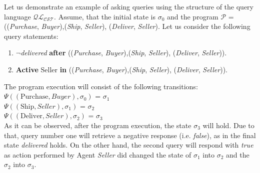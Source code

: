 \documentclass[a4paper]{article}
\begin{document}
Let us demonstrate an example of asking queries using the structure of the query language $\mathcal{QL_{CST}}$. 
Assume, that the initial state is $\sigma_0$ and the program $\mathcal{P}$ = ((\textit{Purchase}, \textit{Buyer}),(\textit{Ship}, \textit{Seller}), (\textit{Deliver}, \textit{Seller}).
Let us consider the following query statements:
\begin{enumerate}
  \item $\neg$\textit{delivered} \textbf{after} ((\textit{Purchase}, \textit{Buyer}),(\textit{Ship}, \textit{Seller}), (\textit{Deliver}, \textit{Seller})).
  \item \textbf{Active} Seller \textbf{in} ((\textit{Purchase}, \textit{Buyer}),(\textit{Ship}, \textit{Seller}), (\textit{Deliver}, \textit{Seller})).
\end{enumerate}
The program execution will consist of the following transitions: \\[0.5\baselineskip]
$\Psi((\text{Purchase},Buyer),\sigma_0)$ = $\sigma_1$ \\[0.1\baselineskip]
$\Psi((\text{Ship},Seller),\sigma_1)$ = $\sigma_2$ \\[0.1\baselineskip]
$\Psi((\text{Deliver},Seller),\sigma_2)$ = $\sigma_3$ \\[0.7\baselineskip]
As it can be observed, after the program execution, the state $\sigma_3$ will hold. Due to that, query number one will retrieve a negative response (i.e. \textit{false}), 
as in the final state \textit{delivered} holds. 
On the other hand, the second query will respond with \textit{true} as  action performed by Agent \textit{Seller} did changed the state of $\sigma_1$ into $\sigma_2$ and the $\sigma_2$ into $\sigma_3$.
\end{document}
